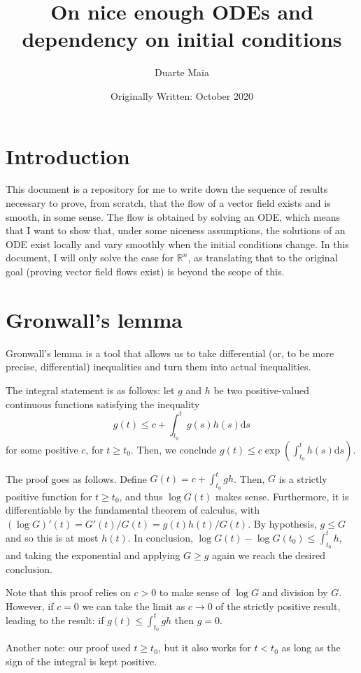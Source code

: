 \documentclass{article}
\title{On nice enough ODEs and dependency on initial conditions}
\author{Duarte Maia}
\date{Originally Written: October 2020}
\newcommand{\R}{\mathbb{R}}
\newcommand{\dd}{\mathrm{d}}
\begin{document}
\maketitle

\section{Introduction}

This document is a repository for me to write down the sequence of results necessary to prove, from scratch, that the flow of a vector field exists and is smooth, in some sense. The flow is obtained by solving an ODE, which means that I want to show that, under some niceness assumptions, the solutions of an ODE exist locally and vary smoothly when the initial conditions change. In this document, I will only solve the case for $\R^n$, as translating that to the original goal (proving vector field flows exist) is beyond the scope of this.

\section{Gronwall's lemma}

Gronwall's lemma is a tool that allows us to take differential (or, to be more precise, differential) inequalities and turn them into actual inequalities.

The integral statement is as follows: let $g$ and $h$ be two positive-valued continuous functions satisfying the inequality
\[g(t) \leq c + \int_{t_0}^t g(s) h(s) \dd s\]
for some positive $c$, for $t \geq t_0$. Then, we conclude $g(t) \leq c \exp(\int_{t_0}^t h(s) \dd s)$.

The proof goes as follows. Define $G(t) = c + \int_{t_0}^t gh$. Then, $G$ is a strictly positive function for $t \geq t_0$, and thus $\log G(t)$ makes sense. Furthermore, it is differentiable by the fundamental theorem of calculus, with $(\log G)'(t) = G'(t)/G(t) = g(t) h(t) / G(t)$. By hypothesis, $g \leq G$ and so this is at most $h(t)$. In conclusion, $\log G(t) - \log G(t_0) \leq \int_{t_0}^t h$, and taking the exponential and applying $G \geq g$ again we reach the desired conclusion.

Note that this proof relies on $c > 0$ to make sense of $\log G$ and division by $G$. However, if $c = 0$ we can take the limit as $c \to 0$ of the strictly positive result, leading to the result: if $g(t) \leq \int_{t_0}^t g h$ then $g = 0$.

Another note: our proof used $t \geq t_0$, but it also works for $t < t_0$ as long as the sign of the integral is kept positive.
\end{document}
